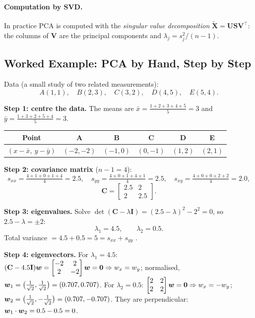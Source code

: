 \paragraph{Computation by SVD.} In practice PCA is computed with the \emph{singular value decomposition} $\tilde{\mathbf X}=\mathbf U\mathbf S\mathbf V^{\!\top}$: the columns of $\mathbf V$ are the principal components and $\lambda_j=s_j^2/(n-1)$.

\subsection{Worked Example: PCA by Hand, Step by Step}\label{sec:pcaex}

\begin{example}
Data (a small study of two related measurements):
\[
  A(1,1),\quad B(2,3),\quad C(3,2),\quad D(4,5),\quad E(5,4).
\]

\medskip
\textbf{Step 1: centre the data.} The means are $\bar x=\frac{1+2+3+4+5}{5}=3$ and $\bar y=\frac{1+3+2+5+4}{5}=3$.
\begin{center}
\begin{tabular}{@{}c|ccccc@{}}
\toprule
Point & A & B & C & D & E\\
\midrule
$(x-\bar x,\ y-\bar y)$ & $(-2,-2)$ & $(-1,0)$ & $(0,-1)$ & $(1,2)$ & $(2,1)$\\
\bottomrule
\end{tabular}
\end{center}

\textbf{Step 2: covariance matrix} ($n-1=4$):
\[
  s_{xx}=\tfrac{4+1+0+1+4}{4}=2.5,\quad s_{yy}=\tfrac{4+0+1+4+1}{4}=2.5,\quad s_{xy}=\tfrac{4+0+0+2+2}{4}=2.0,
\]
\[
  \mathbf C=\begin{bmatrix}2.5&2\\2&2.5\end{bmatrix}.
\]

\textbf{Step 3: eigenvalues.} Solve $\det(\mathbf C-\lambda\mathbf I)=(2.5-\lambda)^2-2^2=0$, so $2.5-\lambda=\pm2$:
\[
  \lambda_1=4.5,\qquad\lambda_2=0.5 .
\]
Total variance $=4.5+0.5=5=s_{xx}+s_{yy}$ \checkmark.

\medskip
\textbf{Step 4: eigenvectors.} For $\lambda_1=4.5$: $(\mathbf C-4.5\mathbf I)\boldsymbol{w}=\begin{bmatrix}-2&2\\2&-2\end{bmatrix}\boldsymbol{w}=\boldsymbol{0}\Rightarrow w_x=w_y$; normalised, $\boldsymbol{w}_1=\big(\tfrac1{\sqrt2},\tfrac1{\sqrt2}\big)=(0.707,0.707)$. For $\lambda_2=0.5$: $\begin{bmatrix}2&2\\2&2\end{bmatrix}\boldsymbol{w}=\boldsymbol{0}\Rightarrow w_x=-w_y$; $\boldsymbol{w}_2=\big(\tfrac1{\sqrt2},-\tfrac1{\sqrt2}\big)=(0.707,-0.707)$. They are perpendicular: $\boldsymbol{w}_1\cdot\boldsymbol{w}_2=0.5-0.5=0$.


\end{example}
